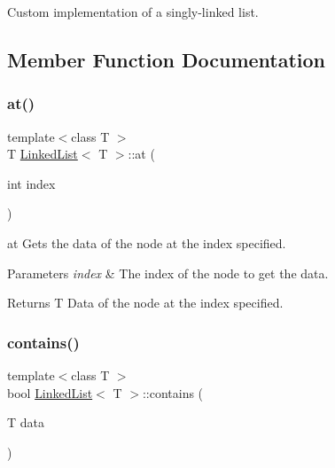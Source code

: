 Custom implementation of a singly-\/linked list. 

\subsection{Member Function Documentation}
\mbox{\label{classLinkedList_ae3f37e8947f8fc4dd932bcf41d0344ec}} 
\subsubsection{\texorpdfstring{at()}{at()}}
{\footnotesize\ttfamily template$<$class T $>$ \\
T \hyperlink{classLinkedList}{Linked\+List}$<$ T $>$\+::at (\begin{DoxyParamCaption}\item[{int}]{index }\end{DoxyParamCaption})\hspace{0.3cm}{\ttfamily [inline]}}



at Gets the data of the node at the index specified. 


\begin{DoxyParams}{Parameters}
{\em index} & The index of the node to get the data. \\
\hline
\end{DoxyParams}
\begin{DoxyReturn}{Returns}
T Data of the node at the index specified. 
\end{DoxyReturn}
\mbox{\label{classLinkedList_a603e1c5a0a4528d82f83b9393f83bf22}} 
\subsubsection{\texorpdfstring{contains()}{contains()}}
{\footnotesize\ttfamily template$<$class T $>$ \\
bool \hyperlink{classLinkedList}{Linked\+List}$<$ T $>$\+::contains (\begin{DoxyParamCaption}\item[{T}]{data }\end{DoxyParamCaption})\hspace{0.3cm}{\ttfamily [inline]}}



